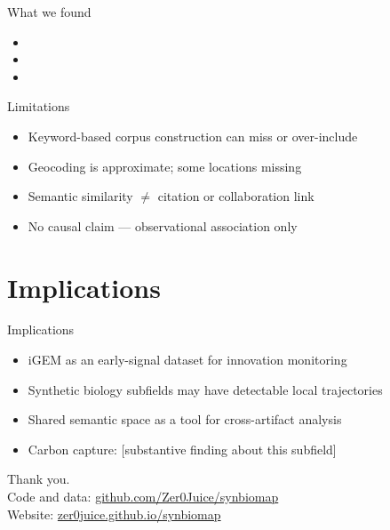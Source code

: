 \documentclass[aspectratio=169, 12pt]{beamer}
\begin{document}
\begin{frame}{What we found}
  \begin{itemize}
    \item [Main finding 1]
    \item [Main finding 2]
    \item [Main finding 3]
  \end{itemize}
\end{frame}

\begin{frame}{Limitations}
  \begin{itemize}
    \item Keyword-based corpus construction can miss or over-include
    \item Geocoding is approximate; some locations missing
    \item Semantic similarity $\neq$ citation or collaboration link
    \item No causal claim — observational association only
  \end{itemize}
\end{frame}

\section{Implications}

\begin{frame}{Implications}
  \begin{itemize}
    \item iGEM as an early-signal dataset for innovation monitoring
    \item Synthetic biology subfields may have detectable local trajectories
    \item Shared semantic space as a tool for cross-artifact analysis
    \item Carbon capture: [substantive finding about this subfield]
  \end{itemize}
\end{frame}

\begin{frame}[standout]
  Thank you.\\
  \vspace{1em}
  \small
  Code and data: \href{https://github.com/Zer0Juice/synbiomap}{github.com/Zer0Juice/synbiomap}\\
  Website: \href{https://zer0juice.github.io/synbiomap}{zer0juice.github.io/synbiomap}
\end{frame}

\end{document}
